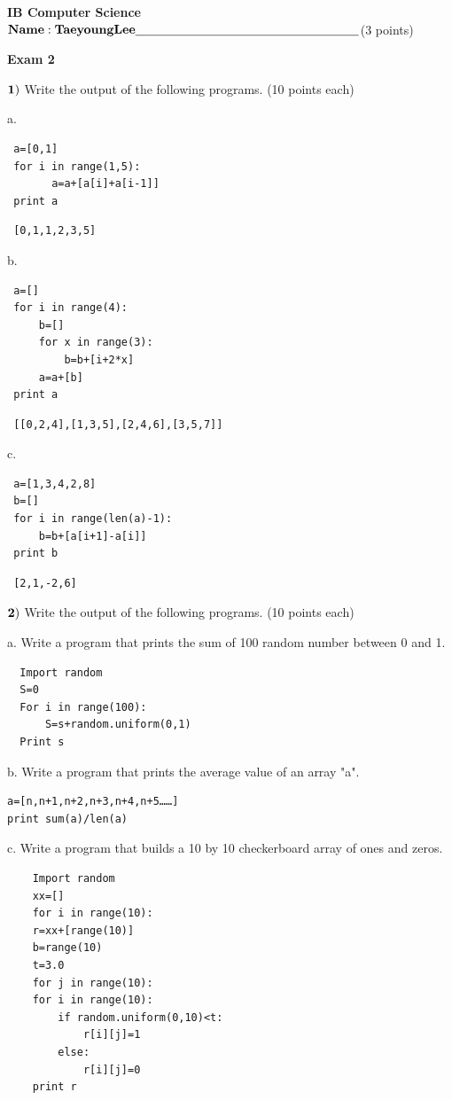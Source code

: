 \documentclass{article}
\begin{document}

\doublespacing
\textbf{IB Computer Science }                        %
 \hfill                             %
$ {\bf Name:TaeyoungLee} \underline{\hspace{2.5in}}$(3 points)

\begin{centering}
\vspace{1cm}
\textbf{Exam 2}\\
\end{centering}
\vspace{1cm}
 

  
 $\bf{1)}$ Write the output of the following programs. (10 points each)
 
 \vspace{1cm}

  
 a.   \begin{verbatim}
 a=[0,1]
 for i in range(1,5):
       a=a+[a[i]+a[i-1]]
 print a
 \end{verbatim}
 \vspace{1cm}
 \begin{verbatim}
 [0,1,1,2,3,5]
 \end{verbatim}
 b.  \begin{verbatim}
 a=[]
 for i in range(4):
     b=[]
     for x in range(3):
         b=b+[i+2*x]
     a=a+[b]
 print a
 \end{verbatim}
 \vspace{1cm}
 
 \begin{verbatim}
 [[0,2,4],[1,3,5],[2,4,6],[3,5,7]]
 \end{verbatim}

 c.  \begin{verbatim}
 a=[1,3,4,2,8]
 b=[]
 for i in range(len(a)-1):
     b=b+[a[i+1]-a[i]]
 print b
 \end{verbatim}
 \begin{verbatim}
 [2,1,­‐2,6]
 \end{verbatim}
  \newpage
  
  $\bf{2)}$ Write the output of the following programs. (10 points each)
  
  a.  Write a program that prints the sum of 100 random number between 0 and 1. 
  \begin{verbatim}
  Import random
  S=0
  For i in range(100):
	  S=s+random.uniform(0,1)
  Print s
  \end{verbatim}
  b.  Write a program that prints the average value of an array "a". 
  \begin{verbatim}
a=[n,n+1,n+2,n+3,n+4,n+5……]
print sum(a)/len(a)
  \end{verbatim}
  c.  Write a program that builds a 10 by 10 checkerboard array of ones and zeros.
	\begin{verbatim}
	Import random
	xx=[]
	for i in range(10):
	r=xx+[range(10)]
	b=range(10)
	t=3.0
	for j in range(10):
	for i in range(10):
		if random.uniform(0,10)<t:
			r[i][j]=1
		else:
			r[i][j]=0
	print r
	\end{verbatim}
  
\end{document}
